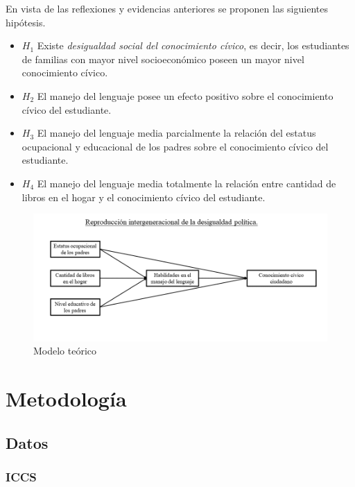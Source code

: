 \documentclass[12pt,twoside]{templates/facsothesis}
\begin{document}
En vista de las reflexiones y evidencias anteriores se proponen las siguientes hipótesis.

\begin{itemize}
\item
  \(H_1\) Existe \emph{desigualdad social del conocimiento cívico}, es decir, los estudiantes de familias con mayor nivel socioeconómico poseen un mayor nivel conocimiento cívico.
\item
  \(H_2\) El manejo del lenguaje posee un efecto positivo sobre el conocimiento cívico del estudiante.
\item
  \(H_3\) El manejo del lenguaje media parcialmente la relación del estatus ocupacional y educacional de los padres sobre el conocimiento cívico del estudiante.
\item
  \(H_4\) El manejo del lenguaje media totalmente la relación entre cantidad de libros en el hogar y el conocimiento cívico del estudiante.
\end{itemize}

\begin{figure}

{\centering \includegraphics[width=0.95\linewidth]{images/modelo} 

}

\caption{Modelo teórico}\label{fig:unnamed-chunk-2}
\end{figure}

\hypertarget{metodologuxeda}{%
\chapter{Metodología}\label{metodologuxeda}}

\hypertarget{datos}{%
\section{Datos}\label{datos}}

\hypertarget{iccs}{%
\subsection{ICCS}\label{iccs}}
\end{document}
